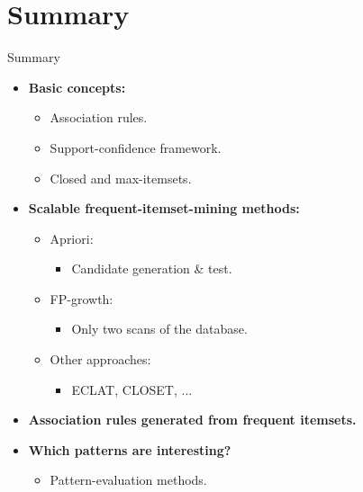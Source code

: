 \section{Summary}

\begin{frame}{Summary}
	\begin{itemize}
		\item \textbf{Basic concepts:}
		      \begin{itemize}
			      \item Association rules.
			      \item Support-confidence framework.
			      \item Closed and max-itemsets.
		      \end{itemize}
		\item \textbf{Scalable frequent-itemset-mining methods:}
		      \begin{itemize}
			      \item Apriori:
			            \begin{itemize}
				            \item Candidate generation \& test.
			            \end{itemize}
			      \item FP-growth:
			            \begin{itemize}
				            \item Only two scans of the database.
			            \end{itemize}
			      \item Other approaches:
			            \begin{itemize}
				            \item ECLAT, CLOSET, $\ldots$
			            \end{itemize}
		      \end{itemize}
		\item \textbf{Association rules generated from frequent
			      itemsets.}
		\item \textbf{Which patterns are interesting?}
		      \begin{itemize}
			      \item Pattern-evaluation methods.
		      \end{itemize}
	\end{itemize}
\end{frame}
